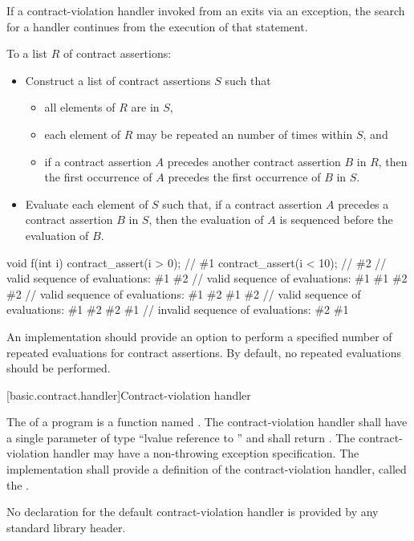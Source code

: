 \begin{note}
If a contract-violation handler
invoked from an 
exits via an exception,
the search for a handler
continues from the execution of that statement.
\end{note}

\pnum
To  a list $R$ of contract assertions:
\begin{itemize}
\item
Construct a list of contract assertions $S$ such that
\begin{itemize}
\item
all elements of $R$ are in $S$,
\item
each element of $R$
may be repeated an
number of times
within $S$, and
\item
if a contract assertion $A$
precedes another contract assertion $B$
in $R$,
then the
first occurrence of $A$
precedes the first occurrence of $B$
in $S$.
\end{itemize}
\item
Evaluate each element of $S$ such that,
if a contract assertion $A$
precedes a contract assertion $B$
in $S$,
then the evaluation of $A$
is sequenced before
the evaluation of $B$.
\end{itemize}

\begin{example}
\begin{codeblock}
void f(int i)
{
  contract_assert(i > 0);   // \#1
  contract_assert(i < 10);  // \#2
    // valid sequence of evaluations: \#1 \#2
    // valid sequence of evaluations: \#1 \#1 \#2 \#2
    // valid sequence of evaluations: \#1 \#2 \#1 \#2
    // valid sequence of evaluations: \#1 \#2 \#2 \#1
    // invalid sequence of evaluations: \#2 \#1
}
\end{codeblock}
\end{example}

\pnum
\recommended
An implementation should
provide an option to perform
a specified number of repeated evaluations
for contract assertions.
By default,
no repeated evaluations should be performed.

[basic.contract.handler]{Contract-violation handler}

\pnum
{}%
%
The 
of a program is a function named
.
The contract-violation handler
shall have a single parameter
of type
``lvalue reference to  ''
and shall return .
The contract-violation handler
may have a non-throwing exception specification.
The implementation
shall provide a definition of the contract-violation handler,
called the .
\begin{note}
No declaration
for the default contract-violation handler
is provided by
any standard library header.
\end{note}

